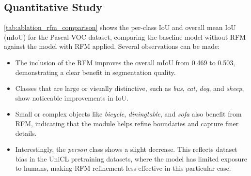 \subsection{Quantitative Study}

\autoref{tab:ablation_rfm_comparison} shows the per-class IoU and overall mean IoU (mIoU) for the Pascal VOC dataset, comparing the baseline model without RFM against the model with RFM applied. Several observations can be made:

\begin{itemize}
    \item The inclusion of the RFM improves the overall mIoU from 0.469 to 0.503, demonstrating a clear benefit in segmentation quality.
    \item Classes that are large or visually distinctive, such as \textit{bus}, \textit{cat}, \textit{dog}, and \textit{sheep}, show noticeable improvements in IoU.
    \item Small or complex objects like \textit{bicycle}, \textit{diningtable}, and \textit{sofa} also benefit from RFM, indicating that the module helps refine boundaries and capture finer details.
    \item Interestingly, the \textit{person} class shows a slight decrease. This reflects dataset bias in the UniCL pretraining datasets, where the model has limited exposure to humans, making RFM refinement less effective in this particular case.
\end{itemize}


